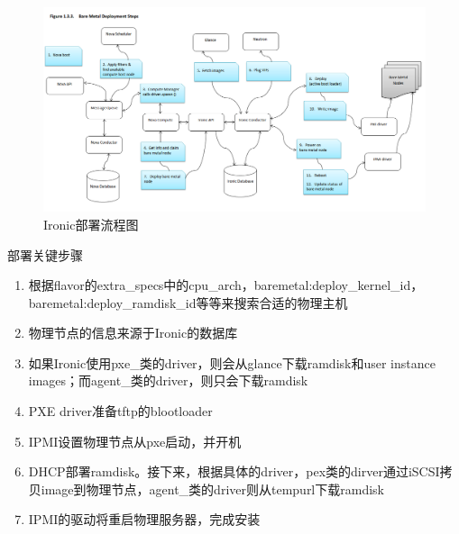 \begin{figure}[H]
  \centering
  \includegraphics[width=\linewidth]{deployment_steps.png}
  \caption{Ironic部署流程图\protect\footnotemark}
  \label{fig:deployment_steps}
\end{figure}

部署关键步骤
\begin{enumerate}
  \item 根据flavor的extra\_specs中的cpu\_arch，baremetal:deploy\_kernel\_id，baremetal:deploy\_ramdisk\_id等等来搜索合适的物理主机
  \item 物理节点的信息来源于Ironic的数据库
  \item 如果Ironic使用pxe\_类的driver，则会从glance下载ramdisk和user instance images；而agent\_类的driver，则只会下载ramdisk
  \item PXE driver准备tftp的blootloader
  \item IPMI设置物理节点从pxe启动，并开机
  \item DHCP部署ramdisk。接下来，根据具体的driver，pex类的dirver通过iSCSI拷贝image到物理节点，agent\_类的driver则从tempurl下载ramdisk
  \item IPMI的驱动将重启物理服务器，完成安装
\end{enumerate}


